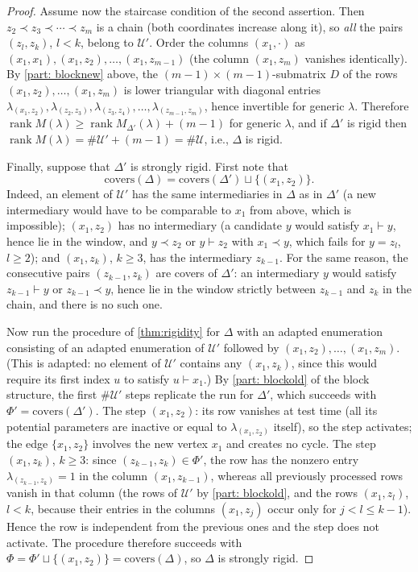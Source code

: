 \documentclass[12pt]{article}
\newcommand{\U}{\mathcal{U}}
\newcommand{\rk}{\operatorname{rank}}
\newcommand{\IM}{\Delta}
\newcommand{\homr}{\vdash}
\newcommand{\extr}{\prec}
\begin{document}
\begin{proof}
Assume now the staircase condition of the second assertion. Then $z_2\extr z_3\extr\cdots\extr z_m$ is a chain
(both coordinates increase along it), so \emph{all} the pairs $(z_l,z_k)$, $l<k$, belong to $\U'$.
Order the columns $(x_1,\cdot)$ as $(x_1,x_1),(x_1,z_2),\dots,(x_1,z_{m-1})$
(the column $(x_1,z_m)$ vanishes identically).
By \cref{part: blocknew} above, the $(m-1)\times(m-1)$-submatrix $D$ of the rows $(x_1,z_2),\dots,(x_1,z_m)$ is lower triangular with
diagonal entries $\lambda_{(x_1,z_2)},\lambda_{(z_2,z_3)},\lambda_{(z_3,z_4)},\dots,\lambda_{(z_{m-1},z_m)}$,
hence invertible for generic $\lambda$. Therefore
$\rk M(\lambda)\ge\rk M_{\IM'}(\lambda)+(m-1)$ for generic $\lambda$, and if $\IM'$ is rigid then
$\rk M(\lambda)=\#\U'+(m-1)=\#\U$, i.e., $\IM$ is rigid.

Finally, suppose that $\IM'$ is strongly rigid. First note that
\[
\text{covers}(\IM)=\text{covers}(\IM')\sqcup\{(x_1,z_2)\}.
\]
Indeed, an element of $\U'$ has the same intermediaries in $\IM$ as in $\IM'$ (a new intermediary would have to
be comparable to $x_1$ from above, which is impossible); $(x_1,z_2)$ has no intermediary (a candidate $y$ would
satisfy $x_1\homr y$, hence lie in the window, and $y\extr z_2$ or $y\homr z_2$ with $x_1\extr y$, which fails for
$y=z_l$, $l\ge2$); and $(x_1,z_k)$, $k\ge3$, has the intermediary $z_{k-1}$. For the same reason, the consecutive
pairs $(z_{k-1},z_k)$ are covers of $\IM'$: an intermediary $y$ would satisfy $z_{k-1}\homr y$ or $z_{k-1}\extr y$,
hence lie in the window strictly between $z_{k-1}$ and $z_k$ in the chain, and there is no such one.

Now run the procedure of \cref{thm:rigidity} for $\IM$ with an adapted enumeration consisting of an adapted
enumeration of $\U'$ followed by $(x_1,z_2),\dots,(x_1,z_m)$. (This is adapted: no element of $\U'$ contains any
$(x_1,z_k)$, since this would require its first index $u$ to satisfy $u\homr x_1$.) By \cref{part: blockold} of the block structure,
the first $\#\U'$ steps replicate the run for $\IM'$, which succeeds with
$\Phi'=\text{covers}(\IM')$. The step $(x_1,z_2)$: its row vanishes at test time (all its potential parameters are
inactive or equal to $\lambda_{(x_1,z_2)}$ itself), so the step activates; the edge $\{x_1,z_2\}$ involves the new
vertex $x_1$ and creates no cycle. The step $(x_1,z_k)$, $k\ge3$: since $(z_{k-1},z_k)\in\Phi'$, the row has the
nonzero entry $\lambda_{(z_{k-1},z_k)}=1$ in the column $(x_1,z_{k-1})$, whereas all previously processed rows vanish
in that column (the rows of $\U'$ by \cref{part: blockold}, and the rows $(x_1,z_l)$, $l<k$, because their entries in the columns
$(x_1,z_j)$ occur only for $j<l\le k-1$). Hence the row is independent from the previous ones and the step does not
activate. The procedure therefore succeeds with $\Phi=\Phi'\sqcup\{(x_1,z_2)\}=\text{covers}(\IM)$, so $\IM$ is
strongly rigid.
\end{proof}
\end{document}
